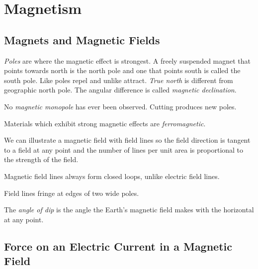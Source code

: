 \chapter{Magnetism}

\section{Magnets and Magnetic Fields}

\begin{definition}[Poles]
    \emph{Poles} are where the magnetic effect is strongest. A freely suspended magnet that points towards north is the north pole and one that points south is called the south pole. Like poles repel and unlike attract. \emph{True north} is different from geographic north pole. The angular difference is called \emph{magnetic declination}.
\end{definition}
\begin{note}
    No \emph{magnetic monopole} has ever been observed. Cutting produces new poles.
\end{note}
\begin{definition}[Ferromagnetic]
    Materials which exhibit strong magnetic effects are \emph{ferromagnetic}.
\end{definition}
\begin{remark}
    We can illustrate a magnetic field with field lines so the field direction is tangent to a field at any point and the number of lines per unit area is proportional to the strength of the field.
    
    Magnetic field lines always form closed loops, unlike electric field lines.

    Field lines fringe at edges of two wide poles.
\end{remark}
\begin{note}
    The \emph{angle of dip} is the angle the Earth's magnetic field makes with the horizontal at any point.
\end{note}

\section{Force on an Electric Current in a Magnetic Field}

